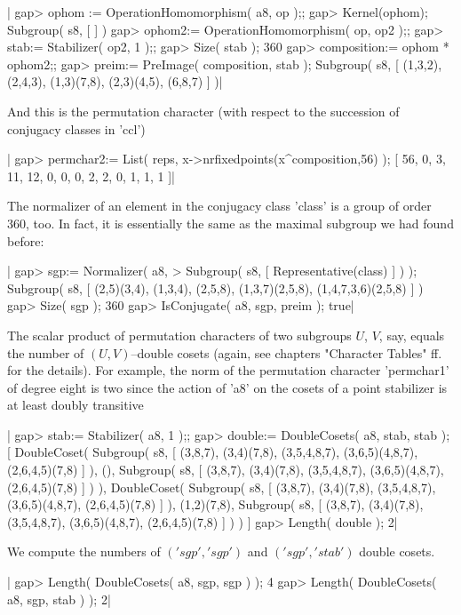 |    gap> ophom := OperationHomomorphism( a8, op  );;
    gap> Kernel(ophom);
    Subgroup( s8, [  ] )
    gap> ophom2:= OperationHomomorphism( op, op2 );;
    gap> stab:= Stabilizer( op2, 1 );;
    gap> Size( stab );
    360
    gap> composition:= ophom * ophom2;;
    gap> preim:= PreImage( composition, stab );
    Subgroup( s8, [ (1,3,2), (2,4,3), (1,3)(7,8), (2,3)(4,5), (6,8,7) ] )|

And this is the permutation character (with respect to the succession  of
conjugacy classes in 'ccl')\:

|    gap> permchar2:= List( reps, x->nrfixedpoints(x^composition,56) );
    [ 56, 0, 3, 11, 12, 0, 0, 0, 2, 2, 0, 1, 1, 1 ]|

The normalizer of an element in the conjugacy class 'class' is a group of
order 360,  too.   In fact,  it is  essentially the  same  as the maximal
subgroup we had found before:

|    gap> sgp:= Normalizer( a8,
    >                      Subgroup( s8, [ Representative(class) ] ) );
    Subgroup( s8, [ (2,5)(3,4), (1,3,4), (2,5,8), (1,3,7)(2,5,8),
      (1,4,7,3,6)(2,5,8) ] )
    gap> Size( sgp );
    360
    gap> IsConjugate( a8, sgp, preim );
    true|

The scalar product  of permutation characters of two subgroups  $U$, $V$,
say,  equals the  number of $(U,V)$--double cosets  (again, see  chapters
"Character Tables" ff.  for the details).   For example,  the norm of the
permutation character 'permchar1' of degree eight is two since the action
of  'a8'  on the  cosets  of  a  point  stabilizer  is  at  least  doubly
transitive\:

|    gap> stab:= Stabilizer( a8, 1 );;
    gap> double:= DoubleCosets( a8, stab, stab );
    [ DoubleCoset( Subgroup( s8, [ (3,8,7), (3,4)(7,8), (3,5,4,8,7),
          (3,6,5)(4,8,7), (2,6,4,5)(7,8) ] ), (), Subgroup( s8,
        [ (3,8,7), (3,4)(7,8), (3,5,4,8,7), (3,6,5)(4,8,7),
          (2,6,4,5)(7,8) ] ) ),
      DoubleCoset( Subgroup( s8, [ (3,8,7), (3,4)(7,8), (3,5,4,8,7),
          (3,6,5)(4,8,7), (2,6,4,5)(7,8) ] ), (1,2)(7,8), Subgroup( s8,
        [ (3,8,7), (3,4)(7,8), (3,5,4,8,7), (3,6,5)(4,8,7),
          (2,6,4,5)(7,8) ] ) ) ]
    gap> Length( double );
    2|

We compute the  numbers of $('sgp','sgp')$  and  $('sgp','stab')$  double
cosets.

|    gap> Length( DoubleCosets( a8, sgp, sgp ) );
    4
    gap> Length( DoubleCosets( a8, sgp, stab ) );
    2|

